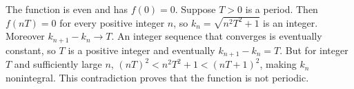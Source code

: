 The function is even and has $f(0)=0$. Suppose $T>0$ is a period. Then $f(nT)=0$ for every positive integer $n$, so $k_n=\sqrt{n^2T^2+1}$ is an integer. Moreover $k_{n+1}-k_n\to T$. An integer sequence that converges is eventually constant, so $T$ is a positive integer and eventually $k_{n+1}-k_n=T$. But for integer $T$ and sufficiently large $n$, $(nT)^2<n^2T^2+1<(nT+1)^2$, making $k_n$ nonintegral. This contradiction proves that the function is not periodic.
